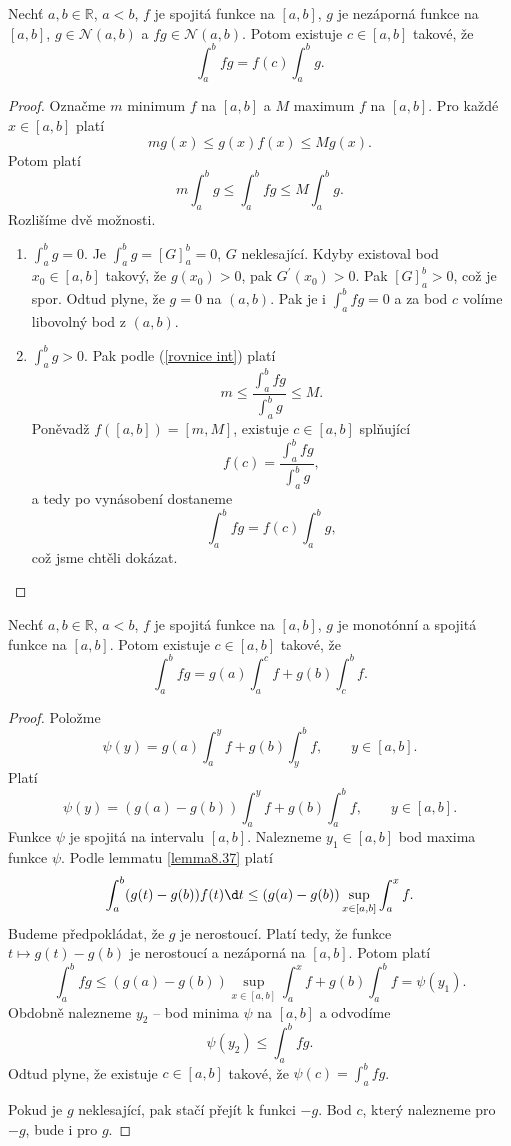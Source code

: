 \begin{veta}\label{veta8.38}
Nechť $a, b \in \mathbb{R}$, $a < b$, $f$ je spojitá funkce na $[a, b]$, $g$ je
nezáporná funkce na $[a, b]$, $g \in \mathcal N(a, b)$ a $fg \in \mathcal N(a, b)$. Potom existuje $c \in [a, b]$ takové, že
\[
\int_a^b fg
=
f(c)\int_a^b g.
\]
\end{veta}

\begin{proof}
	Označme $m$ minimum $f$ na $[a,b]$ a $M$ maximum $f$ na $[a,b]$. Pro každé $x \in [a,b]$ platí
	$$
	    mg(x)\leq g(x)f(x) \leq Mg(x).
	$$
	Potom platí
	\begin{equation}\label{rovnice int}
	m\int_a^b g \leq \int_a^b fg \leq M\int_a^b g.
	\end{equation}
	Rozlišíme dvě možnosti.
	\begin{enumerate}[(1)]
		\item $\int_a^b g = 0$. Je $\int_a^b g = [G]_a^b = 0$, $G$ neklesající. Kdyby existoval bod $x_0\in [a,b]$
		takový, že $g(x_0)>0$, pak $G^\prime(x_0)>0$. Pak $[G]_a^b > 0$, což je spor. Odtud plyne, že
		$g=0$ na $(a,b)$. Pak je i $\int_a^b fg = 0$ a za bod $c$ volíme libovolný bod z $(a,b)$.
		\item $\int_a^b g > 0$. Pak podle (\ref{rovnice int}) platí
		$$
		    m \leq \frac{\int_a^b fg }{\int_a^b g }\leq M.
		$$
		Poněvadž $f([a,b])=[m,M]$, existuje $c \in [a,b]$ splňující
		$$
		f(c) = \frac{\int_a^b fg }{\int_a^b g},
		$$
		a tedy po vynásobení dostaneme
		$$
		    \int_a^b fg = f(c)\int_a^b g,
		$$
		což jsme chtěli dokázat.\qedhere
	\end{enumerate}
\end{proof}

\begin{veta}\label{veta8.39}
Nechť $a, b \in \mathbb{R}$, $a < b$, $f$ je spojitá funkce na $[a, b]$, $g$ je monotónní a
spojitá funkce na $[a, b]$. Potom existuje $c \in [a, b]$ takové, že
\[
\int_a^b fg
=
g(a)\int_a^c f
+
g(b)\int_c^b f.
\tag{2}
\]
\end{veta}

\begin{proof}
	Položme
	$$
	\psi (y) = g(a) \int_a^y f + g(b) \int_y^b f, \qquad y \in [a,b].
	$$
	Platí
	$$
	    \psi(y) = (g(a)-g(b))\int_a^y f + g(b)\int_a^b f, \qquad y \in [a,b].
	$$
	Funkce $\psi$ je spojitá na intervalu $[a,b]$. Nalezneme $y_1\in [a,b]$ bod maxima funkce $\psi$.
	Podle lemmatu \ref{lemma8.37} platí
	$$
	    \int_a^b (g(t)-g(b))f(t)\d t\leq (g(a)-g(b))\sup_{x \in [a,b]} \int_a^x f.
	$$
	Budeme předpokládat, že $g$ je nerostoucí. Platí tedy, že funkce
	$
	    t \mapsto g(t)-g(b)
	$
	je nerostoucí a nezáporná na $[a,b]$. Potom platí
	$$
	    \int_a^b fg\leq (g(a)-g(b))\sup_{x \in [a,b]} \int_a^x f+ g(b)\int_a^b f = \psi(y_1).
	$$
	Obdobně nalezneme $y_2$ -- bod minima $\psi$ na $[a,b]$ a odvodíme
	$$
	    \psi(y_2) \leq \int_a^b fg.
	$$
	Odtud plyne, že existuje $c \in [a,b]$ takové, že $\psi(c)=\int_a^b fg$.
	\par Pokud je $g$ neklesající, pak stačí přejít k funkci $-g$. Bod $c$, který nalezneme
	pro $-g$, bude  i pro $g$.
\end{proof}

